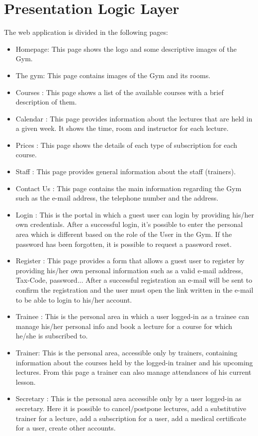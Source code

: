 \section{Presentation Logic Layer}


The web application is divided in the following pages:
\begin{itemize}
	\item Homepage: This page shows the logo and some descriptive images of the Gym.
	\item The gym: This page contains images of the Gym and its rooms.
	\item Courses : This page shows a list of the available courses with a brief description of them.
	\item Calendar : This page provides information about the lectures that are held in a given week. It shows the time, room and instructor for each lecture.
	\item Prices : This page shows the details of each type of subscription for each course.
	\item Staff : This page provides general information about the staff (trainers).
	\item Contact Us : This page contains the main information regarding the Gym such as the e-mail address, the telephone number and the address.
	\item Login : This is the portal in which a guest user can login by providing his/her own credentials. After a successful login, it's possible to enter the personal area which is different based on the role of the User in the Gym. If the password has been forgotten, it is possible to request a password reset.
	\item Register : This page provides a form that allows a guest user to register by providing his/her own personal information such as a valid e-mail address, Tax-Code, password... After a successful registration an e-mail will be sent to confirm the registration and the user must open the link written in the e-mail to be able to login to his/her account.
	\item Trainee : This is the personal area in which a user logged-in as a trainee can manage his/her personal info and book a lecture for a course for which he/she is subscribed to.
	\item Trainer: This  is the personal area, accessible only by trainers, containing information about the courses held by the logged-in trainer and his upcoming lectures. From this page a trainer can also manage attendances of his current lesson.
	\item Secretary : This is the personal area accessible only by a user logged-in as secretary. Here it is possible to cancel/postpone lectures, add a substitutive trainer for a lecture, add a subscription for a user, add a medical certificate for a user, create other accounts.
\end{itemize}

